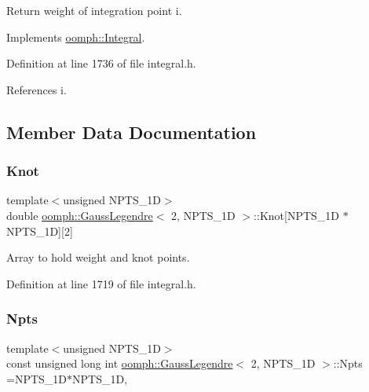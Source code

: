 Return weight of integration point i. 



Implements \hyperlink{classoomph_1_1Integral_ac65335e2aab120b285b3d6c294507b06}{oomph\+::\+Integral}.



Definition at line 1736 of file integral.\+h.



References i.



\subsection{Member Data Documentation}
\mbox{\label{classoomph_1_1GaussLegendre_3_012_00_01NPTS__1D_01_4_a6641e19f354c41913bb61c745d8a595c}} 
\subsubsection{\texorpdfstring{Knot}{Knot}}
{\footnotesize\ttfamily template$<$unsigned N\+P\+T\+S\+\_\+1D$>$ \\
double \hyperlink{classoomph_1_1GaussLegendre}{oomph\+::\+Gauss\+Legendre}$<$ 2, N\+P\+T\+S\+\_\+1D $>$\+::Knot\mbox{[}N\+P\+T\+S\+\_\+1D $\ast$N\+P\+T\+S\+\_\+1D\mbox{]}\mbox{[}2\mbox{]}\hspace{0.3cm}{\ttfamily [private]}}



Array to hold weight and knot points. 



Definition at line 1719 of file integral.\+h.

\mbox{\label{classoomph_1_1GaussLegendre_3_012_00_01NPTS__1D_01_4_a897ee85bffd6510822ebdc5e60e5faee}} 
\subsubsection{\texorpdfstring{Npts}{Npts}}
{\footnotesize\ttfamily template$<$unsigned N\+P\+T\+S\+\_\+1D$>$ \\
const unsigned long int \hyperlink{classoomph_1_1GaussLegendre}{oomph\+::\+Gauss\+Legendre}$<$ 2, N\+P\+T\+S\+\_\+1D $>$\+::Npts =N\+P\+T\+S\+\_\+1D$\ast$N\+P\+T\+S\+\_\+1D\hspace{0.3cm}{\ttfamily [static]}, {\ttfamily [private]}}



